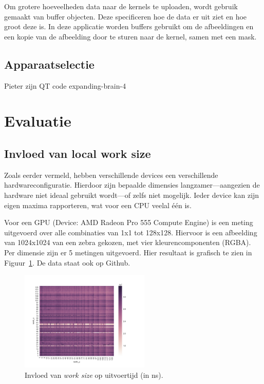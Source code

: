 \documentclass[twocolumn, a4paper]{article}
\begin{document}
Om grotere hoeveelheden data naar de kernels te uploaden, wordt gebruik gemaakt van buffer objecten. Deze specificeren hoe de data er uit ziet en hoe groot deze is. In deze applicatie worden buffers gebruikt om de afbeeldingen en een kopie van de afbeelding door te sturen naar de kernel, samen met een mask.

\subsection{Apparaatselectie}
Pieter zijn QT code expanding-brain-4

\section{Evaluatie}

\subsection{Invloed van local work size}
Zoals eerder vermeld, hebben verschillende devices een verschillende hardwareconfiguratie. Hierdoor zijn bepaalde dimensies langzamer---aangezien de hardware niet ideaal gebruikt wordt---of zelfs niet mogelijk. Ieder device kan zijn eigen maxima rapporteren, wat voor een CPU veelal één is.

Voor een GPU (Device: AMD Radeon Pro 555 Compute Engine) is een meting uitgevoerd over alle combinaties van 1x1 tot 128x128. Hiervoor is een afbeelding van 1024x1024 van een zebra gekozen, met vier kleurencomponenten (RGBA). Per dimensie zijn er 5 metingen uitgevoerd. Hier resultaat is grafisch te zien in Figuur~\ref{fig:output-all}. De data staat ook op Github.

\begin{figure}
    \centering
    \includegraphics[width=0.55\textwidth]{data/output_all}
    \caption{Invloed van \emph{work size} op uitvoertijd (in ns).}\label{fig:output-all}
\end{figure}
\end{document}

